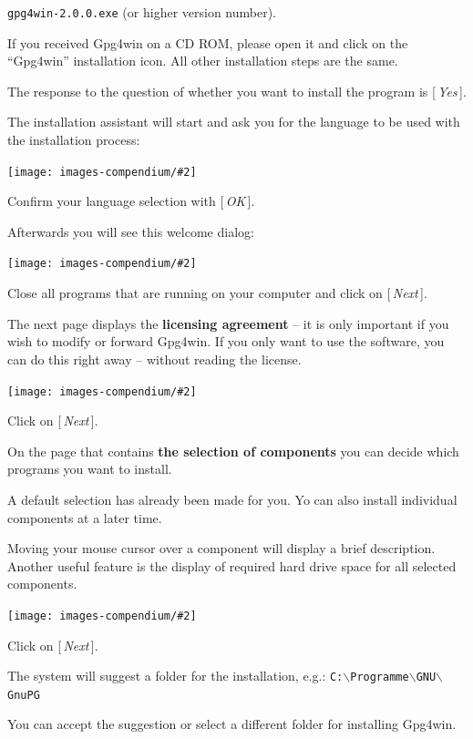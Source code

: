\documentclass[a4paper,11pt,oneside,openright,titlepage]{scrbook}
\newcommand{\Button}[1]{[\,\textit{#1}\,]}
\newcommand{\Filename}[1]{\small{\texttt{#1}}\normalsize}
\newcommand{\IncludeImage}[2][]{
\begin{center}
  \texttt{[image: images-compendium/\#2]}%
\end{center}
}
\begin{document}
\Filename{gpg4win-2.0.0.exe} (or higher version number).

If you received Gpg4win on a CD ROM, please open it and click on the
``Gpg4win'' installation icon.  All other installation steps are the
same.

The response to the question of whether you want to install the
program is \Button{Yes}.

\clearpage
The installation assistant will start and ask you for the language to
be used with the installation process:

\IncludeImage[width=0.5\textwidth]{sc-inst-language_en}

Confirm your language selection with \Button{OK}.

Afterwards you will see this welcome dialog:

\IncludeImage[width=0.85\textwidth]{sc-inst-welcome_en}

Close all programs that are running on your computer and click
on \Button{Next}.

\clearpage
The next page displays the \textbf{licensing agreement} -- it is only
important if you wish to modify or forward Gpg4win.  If you only want
to use the software, you can do this right away -- without reading the
license.

\IncludeImage[width=0.85\textwidth]{sc-inst-license_en}

Click on \Button{Next}.

\clearpage
On the page that contains \textbf{the selection of components} you can
decide which programs you want to install.

A default selection has already been made for you. Yo can also install
individual components at a later time.

Moving your mouse cursor over a component will display a brief
description.  Another useful feature is the display of required hard
drive space for all selected components.

\IncludeImage[width=0.85\textwidth]{sc-inst-components_en}

Click on \Button{Next}.

\clearpage
The system will suggest a folder for the installation, e.g.:
\Filename{C:$\backslash$Programme$\backslash$GNU$\backslash$GnuPG}

You can accept the suggestion or select a different folder for installing
Gpg4win.
\end{document}

